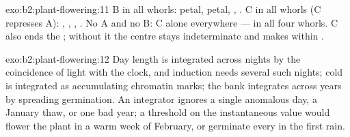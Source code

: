 \begin{solution}{exo:b2:plant-flowering:11}
B in all whorls: petal, petal, , . C in all whorls (C
represses A): , , , . No A and no B: C alone
everywhere ---  in all four whorls. C also ends the
; without it the centre stays indeterminate and makes 
within .
\end{solution}

\begin{solution}{exo:b2:plant-flowering:12}
Day length is integrated across nights by the coincidence of light
with the clock, and induction needs several such nights; cold is
integrated as accumulating chromatin marks; the  bank
integrates across years by spreading germination. An integrator
ignores a single anomalous day, a January thaw, or one bad year;
a threshold on the instantaneous value would flower the plant in a
warm week of February, or germinate every  in the first rain.
\end{solution}

